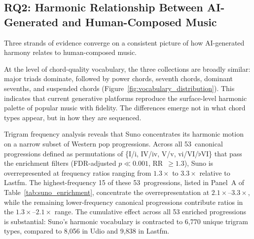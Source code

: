 \documentclass{article}
\begin{document}


\subsection{RQ2: Harmonic Relationship Between AI-Generated and Human-Composed Music}
\label{sec:disc_harmony}

Three strands of evidence converge on a consistent picture of how AI-generated harmony relates to human-composed music.

At the level of chord-quality vocabulary, the three collections are broadly similar: major triads dominate, followed by power chords, seventh chords, dominant sevenths, and suspended chords (Figure~\ref{fig:vocabulary_distribution}). This indicates that current generative platforms reproduce the surface-level harmonic palette of popular music with fidelity. The differences emerge not in what chord types appear, but in how they are sequenced.

Trigram frequency analysis reveals that Suno concentrates its harmonic motion on a narrow subset of Western pop progressions. Across all 53~canonical progressions defined as permutations of \{I/i, IV/iv, V/v, vi/VI/$\flat$VI\} that pass the enrichment filters (FDR-adjusted $p \ll 0.001$, RR~$\geq 1.3$), Suno is overrepresented at frequency ratios ranging from $1.3\times$ to $3.3\times$ relative to Lastfm. The highest-frequency 15 of these 53~progressions, listed in Panel~A of Table~\ref{tab:suno_enrichment}, concentrate the overrepresentation at $2.1\times$--$3.3\times$, while the remaining lower-frequency canonical progressions contribute ratios in the $1.3\times$--$2.1\times$ range. The cumulative effect across all 53 enriched progressions is substantial: Suno's harmonic vocabulary is contracted to 6,770 unique trigram types, compared to 8,056 in Udio and 9,838 in Lastfm.
\end{document}
